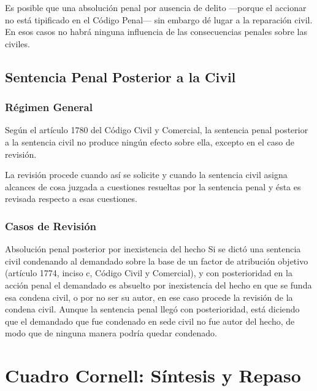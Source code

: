 \documentclass[12pt,oneside]{book}
\begin{document}
Es posible que una absolución penal por ausencia de delito —porque el accionar no está tipificado en el Código Penal— sin embargo dé lugar a la reparación civil. En esos casos no habrá ninguna influencia de las consecuencias penales sobre las civiles.

\section{Sentencia Penal Posterior a la Civil}

\subsection{Régimen General}

Según el artículo 1780 del Código Civil y Comercial, la sentencia penal posterior a la sentencia civil no produce ningún efecto sobre ella, excepto en el caso de revisión.

La revisión procede cuando así se solicite y cuando la sentencia civil asigna alcances de cosa juzgada a cuestiones resueltas por la sentencia penal y ésta es revisada respecto a esas cuestiones.

\subsection{Casos de Revisión}

\begin{example}{Absolución penal posterior por inexistencia del hecho}
Si se dictó una sentencia civil condenando al demandado sobre la base de un factor de atribución objetivo (artículo 1774, inciso c, Código Civil y Comercial), y con posterioridad en la acción penal el demandado es absuelto por inexistencia del hecho en que se funda esa condena civil, o por no ser su autor, en ese caso procede la revisión de la condena civil. Aunque la sentencia penal llegó con posterioridad, está diciendo que el demandado que fue condenado en sede civil no fue autor del hecho, de modo que de ninguna manera podría quedar condenado.
\end{example}


\appendix

\chapter{Cuadro Cornell: Síntesis y Repaso}
\end{document}
